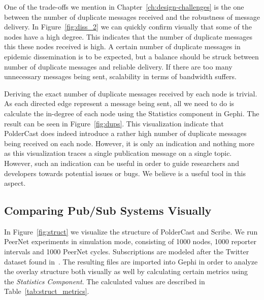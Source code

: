 One of the trade-offs we mention in Chapter~\ref{ch:design-challenges}
is the one between the number of duplicate messages received and the
robustness of message delivery. In Figure~\ref{fig:diss_2} we can
quickly confirm visually that some of the nodes have a high degree. This
indicates that the number of duplicate messages this these nodes
received is high. A certain number of duplicate messages in epidemic
dissemination is to be expected, but a balance should be struck between
number of duplicate messages and reliable delivery. If there are too
many unnecessary messages being sent, scalability in terms of bandwidth
suffers.

Deriving the exact number of duplicate messages received by each node is
trivial. As each directed edge represent  a message being sent, all we
need to do is calculate the in-degree of each node using the Statistics
component in Gephi. The result can be seen in Figure~\ref{fig:dups}.
This visualization indicate that PolderCast does indeed introduce a
rather high number of duplicate messages being received on each node.
However, it is only an indication and nothing more as this visualization
traces a single publication message on a single topic. However, such
an indication can be useful in order to guide researchers and developers
towards potential issues or bugs. We believe \demo is a useful tool in
this aspect.

\subsection{Comparing Pub/Sub Systems Visually}
\label{sec:comparing}

In Figure~\ref{fig:struct} we visualize the structure of PolderCast and
Scribe. We run PeerNet experiments in simulation mode, consisting of
1000 nodes, 1000 reporter intervals and 1000 PeerNet cycles.
Subscriptions are modeled after the Twitter dataset found
in~\cite{Kwak10www}. The resulting \gexf{} files are imported into Gephi
in order to analyze the overlay structure both visually as well by
calculating certain metrics using the \emph{Statistics Component}. The
calculated values are described in Table~\ref{tab:struct_metrics}.

